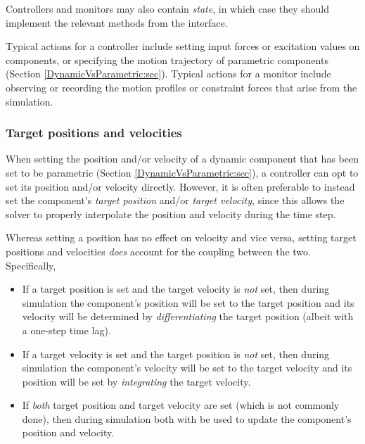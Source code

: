 Controllers and monitors may also contain {\it state}, in which case
they should implement the relevant methods from the
 interface.

Typical actions for a controller include setting input forces or
excitation values on components, or specifying the motion trajectory
of parametric components (Section \ref{DynamicVsParametric:sec}).
Typical actions for a monitor include observing or recording
the motion profiles or constraint forces that arise
from the simulation.

\subsubsection{Target positions and velocities}
\label{targetPositions:sec}

When setting the position and/or velocity of a dynamic component that has been
set to be parametric (Section \ref{DynamicVsParametric:sec}), a controller can
opt to set its position and/or velocity directly. However, it is often preferable
to instead set the component's {\it target position} and/or {\it target
velocity}, since this allows the solver to properly interpolate the position
and velocity during the time step. 

Whereas setting a position has no effect on velocity and vice versa, setting
target positions and velocities {\it does} account for the coupling between the
two. Specifically,

\begin{itemize}

\item If a target position is set and the target velocity is {\it not} set,
then during simulation the component's position will be set to the target
position and its velocity will be determined by {\it differentiating} the
target position (albeit with a one-step time lag).

\item If a target velocity is set and the target position is {\it not} set,
then during simulation the component's velocity will be set to the target
velocity and its position will be set by {\it integrating} the target velocity.

\item If {\it both} target position and target velocity are set (which is not
commonly done), then during simulation both with be used to update the
component's position and velocity.
	
\end{itemize}

